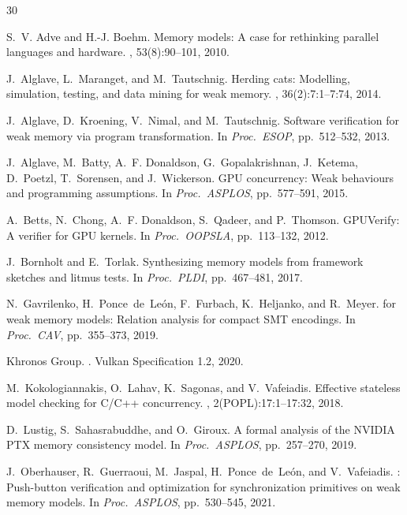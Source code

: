 \documentclass[11pt]{article}
\begin{document}
\begin{thebibliography}{30}

S.~V. Adve and H.-J. Boehm.
\newblock Memory models: A case for rethinking parallel languages and hardware.
, 53(8):90--101, 2010.

J.~Alglave, L.~Maranget, and M.~Tautschnig.
\newblock Herding cats: Modelling, simulation, testing, and data mining for weak memory.
, 36(2):7:1--7:74, 2014.

J.~Alglave, D.~Kroening, V.~Nimal, and M.~Tautschnig.
\newblock Software verification for weak memory via program transformation.
\newblock In {\em Proc.\ ESOP}, pp.\ 512--532, 2013.

J.~Alglave, M.~Batty, A.~F. Donaldson, G.~Gopalakrishnan, J.~Ketema,
D.~Poetzl, T.~Sorensen, and J.~Wickerson.
\newblock GPU concurrency: Weak behaviours and programming assumptions.
\newblock In {\em Proc.\ ASPLOS}, pp.\ 577--591, 2015.

A.~Betts, N.~Chong, A.~F. Donaldson, S.~Qadeer, and P.~Thomson.
\newblock GPUVerify: A verifier for GPU kernels.
\newblock In {\em Proc.\ OOPSLA}, pp.\ 113--132, 2012.

J.~Bornholt and E.~Torlak.
\newblock Synthesizing memory models from framework sketches and litmus tests.
\newblock In {\em Proc.\ PLDI}, pp.\ 467--481, 2017.

N.~Gavrilenko, H.~Ponce~de~Le{\'o}n, F.~Furbach, K.~Heljanko, and
R.~Meyer.
 for weak memory models: Relation analysis for compact
  {SMT} encodings.
\newblock In {\em Proc.\ CAV}, pp.\ 355--373, 2019.

{Khronos Group}.
.
\newblock Vulkan Specification 1.2, 2020.

M.~Kokologiannakis, O.~Lahav, K.~Sagonas, and V.~Vafeiadis.
\newblock Effective stateless model checking for {C/C++} concurrency.
, 2(POPL):17:1--17:32, 2018.

D.~Lustig, S.~Sahasrabuddhe, and O.~Giroux.
\newblock A formal analysis of the {NVIDIA PTX} memory consistency model.
\newblock In {\em Proc.\ ASPLOS}, pp.\ 257--270, 2019.

J.~Oberhauser, R.~Guerraoui, M.~Jaspal, H.~Ponce~de~Le{\'o}n,
and V.~Vafeiadis.
: Push-button verification and optimization for
  synchronization primitives on weak memory models.
\newblock In {\em Proc.\ ASPLOS}, pp.\ 530--545, 2021.


\end{thebibliography}
\end{document}
